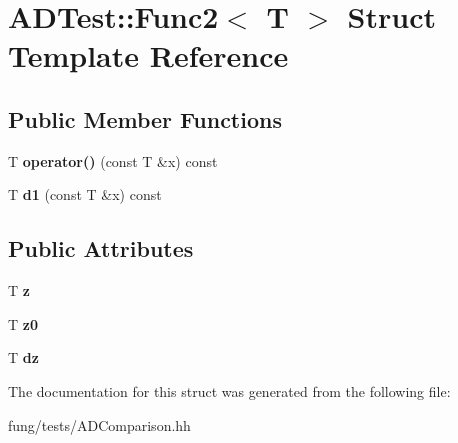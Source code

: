 \hypertarget{structADTest_1_1Func2}{\section{A\-D\-Test\-:\-:Func2$<$ T $>$ Struct Template Reference}
\label{structADTest_1_1Func2}
}
\subsection*{Public Member Functions}
\begin{DoxyCompactItemize}
\item 
\hypertarget{structADTest_1_1Func2_acca865a1d0d41f9890da3b7372315acb}{T {\bfseries operator()} (const T \&x) const }\label{structADTest_1_1Func2_acca865a1d0d41f9890da3b7372315acb}

\item 
\hypertarget{structADTest_1_1Func2_a9035e6ec13ffb73cb9dd852ef31573fa}{T {\bfseries d1} (const T \&x) const }\label{structADTest_1_1Func2_a9035e6ec13ffb73cb9dd852ef31573fa}

\end{DoxyCompactItemize}
\subsection*{Public Attributes}
\begin{DoxyCompactItemize}
\item 
\hypertarget{structADTest_1_1Func2_a71091f4f3be65b9509675305d5ae0022}{T {\bfseries z}}\label{structADTest_1_1Func2_a71091f4f3be65b9509675305d5ae0022}

\item 
\hypertarget{structADTest_1_1Func2_ad68271c401742d5e0877df60a2227655}{T {\bfseries z0}}\label{structADTest_1_1Func2_ad68271c401742d5e0877df60a2227655}

\item 
\hypertarget{structADTest_1_1Func2_a550ee4769dd203768046f463ebfc3b2a}{T {\bfseries dz}}\label{structADTest_1_1Func2_a550ee4769dd203768046f463ebfc3b2a}

\end{DoxyCompactItemize}


The documentation for this struct was generated from the following file\-:\begin{DoxyCompactItemize}
\item 
fung/tests/A\-D\-Comparison.\-hh\end{DoxyCompactItemize}

